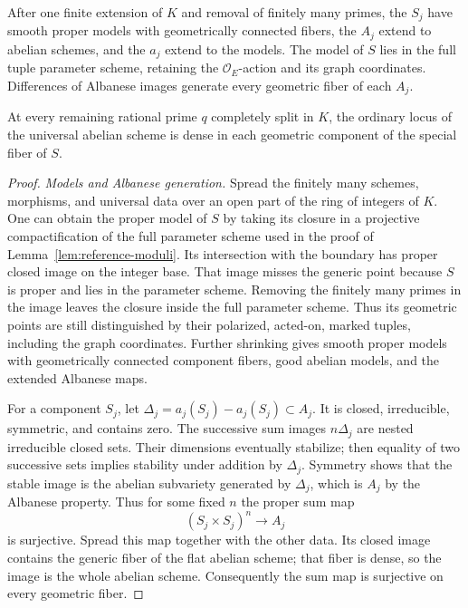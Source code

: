 \begin{lemma}\label{lem:good-ordinary-primes}
After one finite extension of \(K\) and removal of finitely many
primes, the \(S_j\) have smooth proper models with geometrically
connected fibers, the \(A_j\) extend to abelian schemes, and the
\(a_j\) extend to the models.  The model of \(S\) lies in the full
tuple parameter scheme, retaining the \(\mathcal O_E\)-action and its
graph coordinates.  Differences of Albanese images generate every
geometric fiber of each \(A_j\).

At every remaining rational prime \(q\) completely split in \(K\),
the ordinary locus of the universal abelian scheme is dense in each
geometric component of the special fiber of \(S\).
\end{lemma}

\begin{proof}
\emph{Models and Albanese generation.}
Spread the finitely many schemes, morphisms, and universal data over
an open part of the ring of integers of \(K\).  One can obtain the
proper model of \(S\) by taking its closure in a projective
compactification of the full parameter scheme used in the proof of
Lemma~\ref{lem:reference-moduli}.  Its intersection with the boundary
has proper closed image on the integer base.  That image misses the
generic point because \(S\) is proper and lies in the parameter
scheme.  Removing the finitely many primes in the image leaves the
closure inside the full parameter scheme.  Thus its geometric points
are still distinguished by their polarized, acted-on, marked tuples,
including the graph coordinates.  Further shrinking gives smooth
proper models with geometrically connected component fibers, good
abelian models, and the extended Albanese maps.

For a component \(S_j\), let
\(\Delta_j=a_j(S_j)-a_j(S_j)\subset A_j\).  It is closed,
irreducible, symmetric, and contains zero.  The successive sum
images \(n\Delta_j\) are nested irreducible closed sets.  Their
dimensions eventually stabilize; then equality of two successive
sets implies stability under addition by \(\Delta_j\).  Symmetry
shows that the stable image is the abelian subvariety generated by
\(\Delta_j\), which is \(A_j\) by the Albanese property.  Thus for
some fixed \(n\) the proper sum map
\[
(S_j\times S_j)^n\longrightarrow A_j
\]
is surjective.  Spread this map together with the other data.  Its
closed image contains the generic fiber of the flat abelian scheme;
that fiber is dense, so the image is the whole abelian scheme.
Consequently the sum map is surjective on every geometric fiber.


\end{proof}
